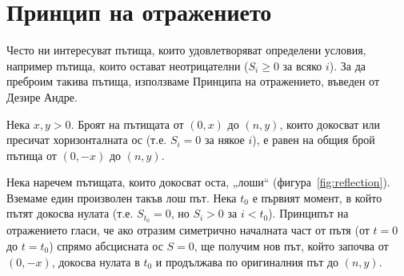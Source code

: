 \section{Принцип на отражението}
Често ни интересуват пътища, които удовлетворяват определени условия, например пътища, които остават неотрицателни ($S_i \geq 0$ за всяко $i$). За да преброим такива пътища, използваме Принципа на отражението, въведен от Дезире Андре.

\begin{keythm}\label{thm:reflection}
Нека $x, y > 0$. Броят на пътищата от $(0,x)$ до $(n,y)$, които докосват или пресичат хоризонталната ос (т.е. $S_i = 0$ за някое $i$), е равен на общия брой пътища от $(0,-x)$ до $(n,y)$.
\end{keythm}

\begin{lecfigure}
\end{lecfigure}

Нека наречем пътищата, които докосват оста, „лоши“ (фигура~\ref{fig:reflection}). Вземаме един произволен такъв лош път. Нека $t_0$ е първият момент, в който пътят докосва нулата (т.е. $S_{t_0} = 0$, но $S_i > 0$ за $i < t_0$). Принципът на отражението гласи, че ако отразим симетрично началната част от пътя (от $t=0$ до $t=t_0$) спрямо абсцисната ос $S=0$, ще получим нов път, който започва от $(0,-x)$, докосва нулата в $t_0$ и продължава по оригиналния път до $(n,y)$.

